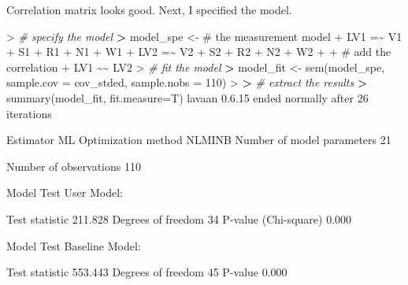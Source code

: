 \documentclass[
]{article}
\newenvironment{Shaded}{\begin{snugshade}}{\end{snugshade}}
\newcommand{\AttributeTok}[1]{\textcolor[rgb]{0.77,0.63,0.00}{#1}}
\newcommand{\CommentTok}[1]{\textcolor[rgb]{0.56,0.35,0.01}{\textit{#1}}}
\newcommand{\DecValTok}[1]{\textcolor[rgb]{0.00,0.00,0.81}{#1}}
\newcommand{\ErrorTok}[1]{\textcolor[rgb]{0.64,0.00,0.00}{\textbf{#1}}}
\newcommand{\FloatTok}[1]{\textcolor[rgb]{0.00,0.00,0.81}{#1}}
\newcommand{\FunctionTok}[1]{\textcolor[rgb]{0.00,0.00,0.00}{#1}}
\newcommand{\NormalTok}[1]{#1}
\newcommand{\OtherTok}[1]{\textcolor[rgb]{0.56,0.35,0.01}{#1}}
\newcommand{\SpecialCharTok}[1]{\textcolor[rgb]{0.00,0.00,0.00}{#1}}
\newcommand{\StringTok}[1]{\textcolor[rgb]{0.31,0.60,0.02}{#1}}
\begin{document}
Correlation matrix looks good. Next, I specified the model.

\begin{Shaded}
\begin{Highlighting}[]
\SpecialCharTok{\textgreater{}} \CommentTok{\# specify the model}
\ErrorTok{\textgreater{}}\NormalTok{ model\_spe }\OtherTok{\textless{}{-}} \StringTok{\textquotesingle{}\# the measurement model}
\StringTok{+               LV1 =\textasciitilde{} V1 + S1 + R1 + N1 + W1}
\StringTok{+               LV2 =\textasciitilde{} V2 + S2 + R2 + N2 + W2}
\StringTok{+ }
\StringTok{+               \# add the correlation}
\StringTok{+               LV1 \textasciitilde{}\textasciitilde{} LV2 \textquotesingle{}}
\SpecialCharTok{\textgreater{}} \CommentTok{\# fit the model}
\ErrorTok{\textgreater{}}\NormalTok{ model\_fit }\OtherTok{\textless{}{-}} \FunctionTok{sem}\NormalTok{(model\_spe, }\AttributeTok{sample.cov =}\NormalTok{ cov\_stded, }\AttributeTok{sample.nobs =} \DecValTok{110}\NormalTok{)  }
\SpecialCharTok{\textgreater{}} 
\ErrorTok{\textgreater{}} \CommentTok{\# extract the results}
\ErrorTok{\textgreater{}} \FunctionTok{summary}\NormalTok{(model\_fit, }\AttributeTok{fit.measure=}\NormalTok{T)}
\NormalTok{lavaan }\DecValTok{0}\NormalTok{.}\FloatTok{6.15}\NormalTok{ ended normally after }\DecValTok{26}\NormalTok{ iterations}

\NormalTok{  Estimator                                         ML}
\NormalTok{  Optimization method                           NLMINB}
\NormalTok{  Number of model parameters                        }\DecValTok{21}

\NormalTok{  Number of observations                           }\DecValTok{110}

\NormalTok{Model Test User Model}\SpecialCharTok{:}
                                                      
\NormalTok{  Test statistic                               }\FloatTok{211.828}
\NormalTok{  Degrees of freedom                                }\DecValTok{34}
\NormalTok{  P}\SpecialCharTok{{-}}\FunctionTok{value}\NormalTok{ (Chi}\SpecialCharTok{{-}}\NormalTok{square)                           }\FloatTok{0.000}

\NormalTok{Model Test Baseline Model}\SpecialCharTok{:}

\NormalTok{  Test statistic                               }\FloatTok{553.443}
\NormalTok{  Degrees of freedom                                }\DecValTok{45}
\NormalTok{  P}\SpecialCharTok{{-}}\NormalTok{value                                        }\FloatTok{0.000}


\end{Highlighting}
\end{Shaded}
\end{document}
